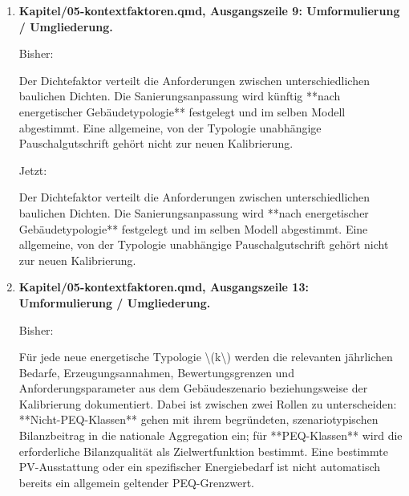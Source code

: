\documentclass[
  ngerman,
  a4paper,
  DIV=11]{scrreprt}
\newenvironment{Shaded}{\begin{snugshade}}{\end{snugshade}}
\newcommand{\NormalTok}[1]{\textcolor[rgb]{0.00,0.23,0.31}{#1}}
\begin{document}
\begin{enumerate}
\begin{Shaded}
\begin{Highlighting}[]
\NormalTok{Für die Kalibrierung in @sec{-}kalibrierung fehlen die definierten PEQ{-}Flächenanteile, die abgestimmte Versorgung der übrigen Typen sowie alternative PV{-}/Flexibilitätsvarianten. Die gelieferte Typologiematrix und ihre Ergebnisse bilden die Grundlage für diese Entscheidungen. Die THG{-}Allokation erhält dadurch nicht automatisch eine neue Flächenbasis.}
\end{Highlighting}
\end{Shaded}
\item
  \textbf{Kapitel/05-kontextfaktoren.qmd, Ausgangszeile 9:
  Umformulierung / Umgliederung.}

  Bisher:

\begin{Shaded}
\begin{Highlighting}[]
\NormalTok{Der Dichtefaktor verteilt die Anforderungen zwischen unterschiedlichen baulichen Dichten. Die Sanierungsanpassung wird künftig **nach energetischer Gebäudetypologie** festgelegt und im selben Modell abgestimmt. Eine allgemeine, von der Typologie unabhängige Pauschalgutschrift gehört nicht zur neuen Kalibrierung.}
\end{Highlighting}
\end{Shaded}

  Jetzt:

\begin{Shaded}
\begin{Highlighting}[]
\NormalTok{Der Dichtefaktor verteilt die Anforderungen zwischen unterschiedlichen baulichen Dichten. Die Sanierungsanpassung wird **nach energetischer Gebäudetypologie** festgelegt und im selben Modell abgestimmt. Eine allgemeine, von der Typologie unabhängige Pauschalgutschrift gehört nicht zur neuen Kalibrierung.}
\end{Highlighting}
\end{Shaded}
\item
  \textbf{Kapitel/05-kontextfaktoren.qmd, Ausgangszeile 13:
  Umformulierung / Umgliederung.}

  Bisher:

\begin{Shaded}
\begin{Highlighting}[]
\NormalTok{Für jede neue energetische Typologie \textbackslash{}(k\textbackslash{}) werden die relevanten jährlichen Bedarfe, Erzeugungsannahmen, Bewertungsgrenzen und Anforderungsparameter aus dem Gebäudeszenario beziehungsweise der Kalibrierung dokumentiert. Dabei ist zwischen zwei Rollen zu unterscheiden: **Nicht{-}PEQ{-}Klassen** gehen mit ihrem begründeten, szenariotypischen Bilanzbeitrag in die nationale Aggregation ein; für **PEQ{-}Klassen** wird die erforderliche Bilanzqualität als Zielwertfunktion bestimmt. Eine bestimmte PV{-}Ausstattung oder ein spezifischer Energiebedarf ist nicht automatisch bereits ein allgemein geltender PEQ{-}Grenzwert.}
\end{Highlighting}
\end{Shaded}


\end{enumerate}
\end{document}
